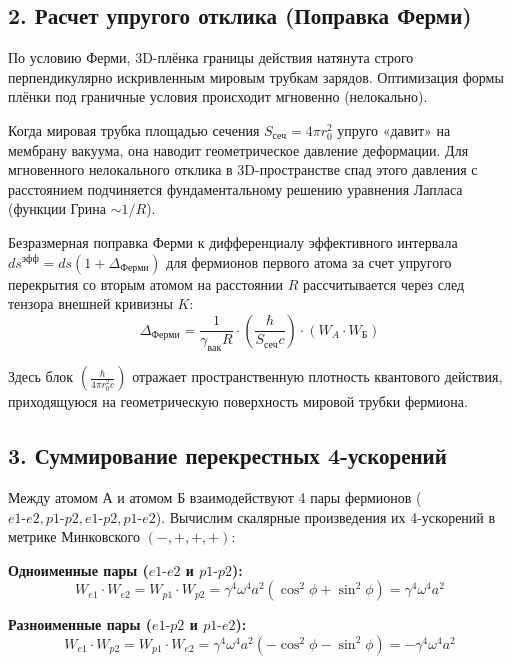 \documentclass[12pt,a4paper]{article}
\begin{document}
\subsection*{2. Расчет упругого отклика (Поправка Ферми)}

По условию Ферми, 3D-плёнка границы действия натянута строго перпендикулярно искривленным мировым трубкам зарядов. Оптимизация формы плёнки под граничные условия происходит мгновенно (нелокально).

Когда мировая трубка площадью сечения $S_{сеч} = 4\pi r_0^2$ упруго «давит» на мембрану вакуума, она наводит геометрическое давление деформации. Для мгновенного нелокального отклика в 3D-пространстве спад этого давления с расстоянием подчиняется фундаментальному решению уравнения Лапласа (функции Грина $\sim 1/R$).

Безразмерная поправка Ферми к дифференциалу эффективного интервала $ds^{эфф} = ds(1 + \Delta_{Ферми})$ для фермионов первого атома за счет упругого перекрытия со вторым атомом на расстоянии $R$ рассчитывается через след тензора внешней кривизны $K$:
\begin{equation}
\Delta_{Ферми} = \frac{1}{\gamma_{вак} R} \cdot \left( \frac{\hbar}{S_{сеч} c} \right) \cdot (W_{A} \cdot W_{Б})
\end{equation}

Здесь блок $\left( \frac{\hbar}{4\pi r_0^2 c} \right)$ отражает пространственную плотность квантового действия, приходящуюся на геометрическую поверхность мировой трубки фермиона.

\subsection*{3. Суммирование перекрестных 4-ускорений}

Между атомом А и атомом Б взаимодействуют 4 пары фермионов ($e1\text{-}e2, p1\text{-}p2, e1\text{-}p2, p1\text{-}e2$). Вычислим скалярные произведения их 4-ускорений в метрике Минковского $(-, +, +, +)$:

\textbf{Одноименные пары ($e1\text{-}e2$ и $p1\text{-}p2$):}
\begin{equation}
W_{e1} \cdot W_{e2} = W_{p1} \cdot W_{p2} = \gamma^4 \omega^4 a^2 (\cos^2\phi + \sin^2\phi) = \gamma^4 \omega^4 a^2
\end{equation}

\textbf{Разноименные пары ($e1\text{-}p2$ и $p1\text{-}e2$):}
\begin{equation}
W_{e1} \cdot W_{p2} = W_{p1} \cdot W_{e2} = \gamma^4 \omega^4 a^2 (-\cos^2\phi - \sin^2\phi) = -\gamma^4 \omega^4 a^2
\end{equation}
\end{document}
